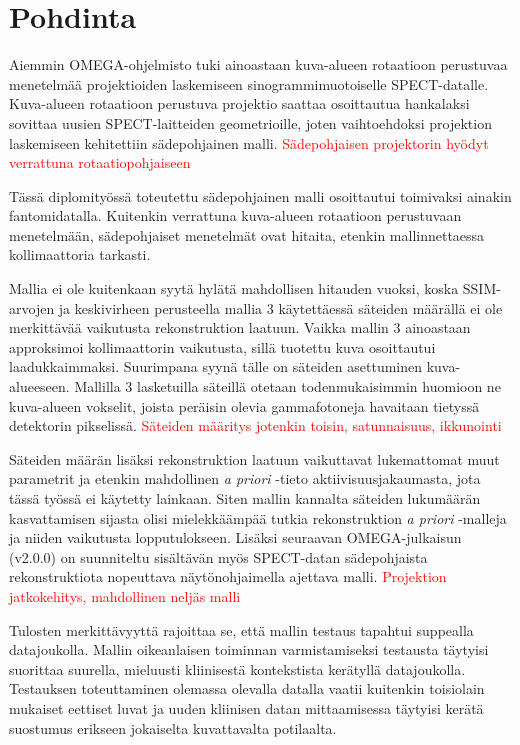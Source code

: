 \section{Pohdinta}
Aiemmin OMEGA-ohjelmisto tuki ainoastaan kuva-alueen rotaatioon perustuvaa menetelmää projektioiden laskemiseen sinogrammimuotoiselle SPECT-datalle. Kuva-alueen rotaatioon perustuva projektio saattaa osoittautua hankalaksi sovittaa uusien SPECT-laitteiden geometrioille, joten vaihtoehdoksi projektion laskemiseen kehitettiin sädepohjainen malli. \textcolor{red}{Sädepohjaisen projektorin hyödyt verrattuna rotaatiopohjaiseen}

Tässä diplomityössä toteutettu sädepohjainen malli osoittautui toimivaksi ainakin fantomidatalla. Kuitenkin verrattuna kuva-alueen rotaatioon perustuvaan menetelmään, sädepohjaiset menetelmät ovat hitaita, etenkin mallinnettaessa kollimaattoria tarkasti.

Mallia ei ole kuitenkaan syytä hylätä mahdollisen hitauden vuoksi, koska SSIM-arvojen ja keskivirheen perusteella mallia 3 käytettäessä säteiden määrällä ei ole merkittävää vaikutusta rekonstruktion laatuun. Vaikka mallin 3 ainoastaan approksimoi kollimaattorin vaikutusta, sillä tuotettu kuva osoittautui laadukkaimmaksi. Suurimpana syynä tälle on säteiden asettuminen kuva-alueeseen. Mallilla 3 lasketuilla säteillä otetaan todenmukaisimmin huomioon ne kuva-alueen vokselit, joista peräisin olevia gammafotoneja havaitaan tietyssä detektorin pikselissä. \textcolor{red}{Säteiden määritys jotenkin toisin, satunnaisuus, ikkunointi}

Säteiden määrän lisäksi rekonstruktion laatuun vaikuttavat lukemattomat muut parametrit ja etenkin mahdollinen \textit{a priori} -tieto aktiivisuusjakaumasta, jota tässä työssä ei käytetty lainkaan. Siten mallin kannalta säteiden lukumäärän kasvattamisen sijasta olisi mielekkäämpää tutkia rekonstruktion \textit{a priori} -malleja ja niiden vaikutusta lopputulokseen. Lisäksi seuraavan OMEGA-julkaisun (v2.0.0) on suunniteltu sisältävän myös SPECT-datan sädepohjaista rekonstruktiota nopeuttava näytönohjaimella ajettava malli. \textcolor{red}{Projektion jatkokehitys, mahdollinen neljäs malli}

Tulosten merkittävyyttä rajoittaa se, että mallin testaus tapahtui suppealla datajoukolla. Mallin oikeanlaisen toiminnan varmistamiseksi testausta täytyisi suorittaa suurella, mieluusti kliinisestä kontekstista kerätyllä datajoukolla. Testauksen toteuttaminen olemassa olevalla datalla vaatii kuitenkin toisiolain mukaiset eettiset luvat ja uuden kliinisen datan mittaamisessa täytyisi kerätä suostumus erikseen jokaiselta kuvattavalta potilaalta.